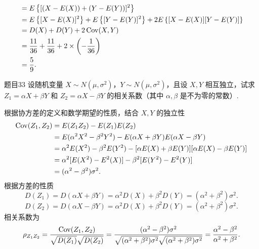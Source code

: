 \begin{solution}
$$\begin{aligned}
             & = E\left\{[(X-E(X)) + (Y-E(Y))]^2\right\}                                                     \\
             & = E\left\{[X-E(X)]^2\right\} + E\left\{[Y-E(Y)]^2\right\} + 2E\left\{[X-E(X)][Y-E(Y)]\right\} \\
             & = D(X) + D(Y) + 2\operatorname{Cov}(X,Y)                                                                    \\
             & = \frac{11}{36} + \frac{11}{36} + 2 \times \left(-\frac{1}{36}\right)                         \\
             & = \frac{5}{9}.
        \end{aligned}
    $$
\end{solution}



\begin{question}{题目33}
    设随机变量 $X \sim N(\mu, \sigma^2)$，$Y \sim N(\mu, \sigma^2)$，且设 $X,Y$ 相互独立，试求 $Z_1 = \alpha X + \beta Y$ 和 $Z_2 = \alpha X - \beta Y$ 的相关系数（其中 $\alpha, \beta$ 是不为零的常数）.
\end{question}
\begin{solution}
    根据协方差的定义和数学期望的性质，结合 $X,Y$ 的独立性
    $$
        \begin{aligned}
            \operatorname{Cov}(Z_1, Z_2)
             & = E(Z_1Z_2) - E(Z_1)E(Z_2)                                                              \\
             & = E(\alpha^2X^2-\beta^2Y^2) - E(\alpha X + \beta Y)E(\alpha X - \beta Y)                \\
             & = \alpha^2E(X^2) - \beta^2E(Y^2) - [\alpha E(X) + \beta E(Y)][\alpha E(X) - \beta E(Y)] \\
             & = \alpha^2[E(X^2)-E^2(X)] - \beta^2 [E(Y^2)-E^2(Y)]                                     \\
             & = (\alpha^2 - \beta^2)\sigma^2.                                                         \\
        \end{aligned}
    $$
    根据方差的性质
    $$
        D(Z_1) = D(\alpha X + \beta Y)
        = \alpha^2D(X) + \beta^2D(Y)
        = (\alpha^2+\beta^2)\sigma^2.
    $$
    $$
        D(Z_2) = D(\alpha X - \beta Y)
        = \alpha^2D(X) + \beta^2D(Y)
        = (\alpha^2+\beta^2)\sigma^2.
    $$
    相关系数为
    $$
        \rho_{Z_1Z_2} = \frac{\operatorname{Cov}(Z_1, Z_2)}{\sqrt{D(Z_1)}\sqrt{D(Z_2)}}
        = \frac{(\alpha^2 - \beta^2)\sigma^2}{\sqrt{(\alpha^2+\beta^2)\sigma^2}\sqrt{(\alpha^2+\beta^2)\sigma^2}}
        = \frac{\alpha^2-\beta^2}{\alpha^2+\beta^2}.
    $$
\end{solution}